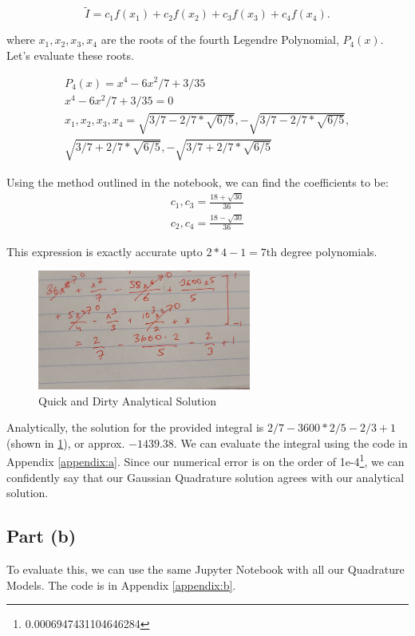 \documentclass{article}
\begin{document}
$$\tilde I = c_1 f(x_1) + c_2 f(x_2) + c_3 f(x_3) + c_4 f(x_4).$$

where $x_1, x_2, x_3, x_4$ are the roots of the fourth Legendre Polynomial, $P_4(x)$. Let's evaluate these roots.

\begin{gather*}
    P_4(x) = x^4-6x^2/7 +3/35 \\
    x^4-6x^2/7 +3/35 = 0 \\
    x_1, x_2, x_3, x_4 = \sqrt{3/7 - 2/7*\sqrt{6/5}}, -\sqrt{3/7 - 2/7*\sqrt{6/5}}, \\
    \sqrt{3/7 + 2/7*\sqrt{6/5}}, -\sqrt{3/7 + 2/7*\sqrt{6/5}}
\end{gather*}

Using the method outlined in the notebook, we can find the coefficients to be:
\begin{gather*}
    c_1, c_3 = {\frac{18 + \sqrt{30}}{36}} \\
    c_2, c_4 = {\frac{18 - \sqrt{30}}{36}}
\end{gather*}

This expression is exactly accurate upto $2*4-1=7$th degree polynomials.


\begin{figure}
  \includegraphics[width=7cm, angle=90]{quick.jpg}
  \caption{Quick and Dirty Analytical Solution}
  \label{fig:ana}
\end{figure}

Analytically, the solution for the provided integral is $2/7-3600*2/5-2/3+1$ (shown in \ref{fig:ana}), or approx. $-1439.38$. We can evaluate the integral using the code in Appendix \ref{appendix:a}. Since our numerical error is on the order of 1e-4\footnote{0.0006947431104646284}, we can confidently say that our Gaussian Quadrature solution agrees with our analytical solution.

\subsection{Part (b)}
To evaluate this, we can use the same Jupyter Notebook with all our Quadrature Models. The code is in Appendix \ref{appendix:b}. 
\end{document}
